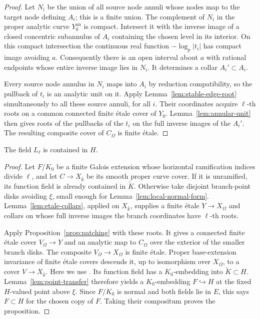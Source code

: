 \begin{proof}
Let $N_i$ be the union of all source node annuli whose nodes map to
the target node defining $A_i$; this is a finite union.
The complement of $N_i$ in the proper analytic curve $Y_0^{\mathrm{an}}$
is compact.  Intersect it with the inverse image of a closed
concentric subannulus of $A_i$ containing the chosen level in its
interior.  On this compact intersection the continuous real function
$-\log_p|t_i|$ has compact image avoiding $a$.
Consequently there is an open interval about $a$ with rational
endpoints whose entire inverse image lies in $N_i$.
It determines a collar $A_i'\subset A_i$.

Every source node annulus in $N_i$ maps into $A_i$ by reduction
compatibility, so the pullback of $t_i$ is an analytic unit on it.
Apply Lemma~\ref{lem:stable-edge-root} simultaneously to all these
source annuli, for all $i$.  Their coordinates acquire $\ell$-th roots
on a common connected finite \'etale cover of $Y_0$.
Lemma~\ref{lem:annular-unit} then gives roots of the pullbacks of
the $t_i$ on the full inverse images of the $A_i'$.
The resulting composite cover of $C_\Omega$ is finite \'etale.
\end{proof}

\begin{proposition}\label{prop:first-stage}
The field $L_\ell$ is contained in $H$.
\end{proposition}

\begin{proof}
Let $F/K_0$ be a finite Galois extension whose horizontal ramification
indices divide $\ell$, and let $C\to X_{\bar k}$ be its smooth
proper curve cover.  If it is unramified, its function field is already
contained in $\widetilde K$.  Otherwise take disjoint branch-point
disks avoiding $\xi$, small enough for
Lemma~\ref{lem:local-normal-form}.
Lemma~\ref{lem:etale-collars}, applied on $X_{\bar k}$, supplies a finite
\'etale $Y\to X_\Omega$ and collars on whose full inverse images the
branch coordinates have $\ell$-th roots.

Apply Proposition~\ref{prop:patching} with these roots.  It gives a
connected finite \'etale cover $V_\Omega\to Y$ and an analytic map to
$C_\Omega$ over the exterior of the smaller branch disks.
The composite $V_\Omega\to X_\Omega$ is finite \'etale.
Proper base-extension invariance of finite \'etale covers descends it,
up to isomorphism over $X_\Omega$, to a cover $V\to X_{\bar k}$.
Here we use \cite[Expos\'e~X, Corollary~1.8]{SGA1}.
Its function field has a $K_0$-embedding into
$\widetilde K\subset H$.
Lemma~\ref{lem:point-transfer} therefore yields a $K_0$-embedding
$F\hookrightarrow H$ at the fixed $H$-valued point above $\xi$.
Since $F/K_0$ is normal and both fields lie in $E$, this says
$F\subset H$ for the chosen copy of $F$.
Taking their compositum proves the proposition.
\end{proof}
